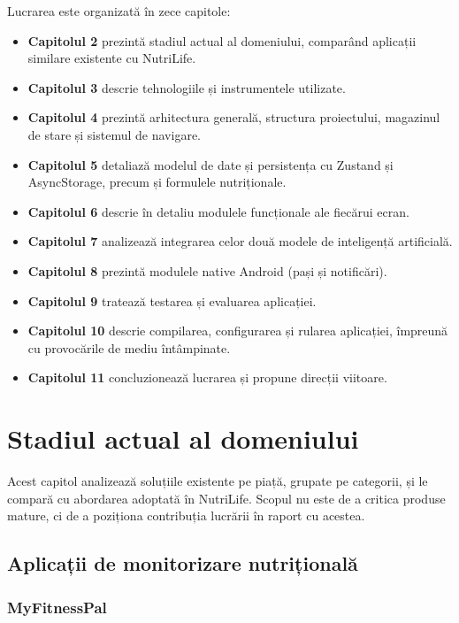 \documentclass[12pt, a4paper, twoside]{report}
\numberwithin{equation}{section}
\begin{document}
Lucrarea este organizată în zece capitole:
\begin{itemize}
  \item \textbf{Capitolul 2} prezintă stadiul actual al domeniului, comparând aplicații
    similare existente cu NutriLife.
  \item \textbf{Capitolul 3} descrie tehnologiile și instrumentele utilizate.
  \item \textbf{Capitolul 4} prezintă arhitectura generală, structura proiectului, magazinul
    de stare și sistemul de navigare.
  \item \textbf{Capitolul 5} detaliază modelul de date și persistența cu Zustand și
    AsyncStorage, precum și formulele nutriționale.
  \item \textbf{Capitolul 6} descrie în detaliu modulele funcționale ale fiecărui ecran.
  \item \textbf{Capitolul 7} analizează integrarea celor două modele de inteligență
    artificială.
  \item \textbf{Capitolul 8} prezintă modulele native Android (pași și notificări).
  \item \textbf{Capitolul 9} tratează testarea și evaluarea aplicației.
  \item \textbf{Capitolul 10} descrie compilarea, configurarea și rularea aplicației, împreună
    cu provocările de mediu întâmpinate.
  \item \textbf{Capitolul 11} concluzionează lucrarea și propune direcții viitoare.
\end{itemize}

\chapter{Stadiul actual al domeniului}

Acest capitol analizează soluțiile existente pe piață, grupate pe categorii, și le compară
cu abordarea adoptată în NutriLife. Scopul nu este de a critica produse mature, ci de a
poziționa contribuția lucrării în raport cu acestea.

\section{Aplicații de monitorizare nutrițională}

\subsection{MyFitnessPal}
\end{document}
